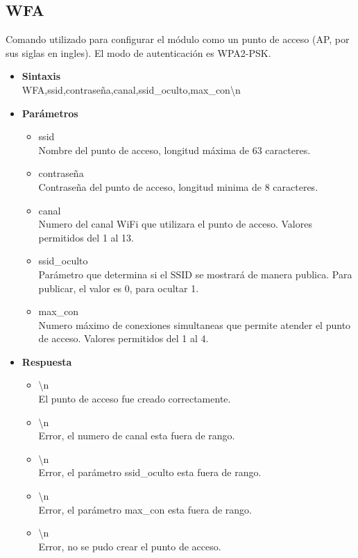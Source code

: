 \documentclass[a4paper,spanish]{article}
\begin{document}
\subsection{WFA}
Comando utilizado para configurar el módulo como un punto de acceso (AP, por sus siglas en ingles). El modo de autenticación es WPA2-PSK.
\begin{itemize}
	\item \textbf{Sintaxis}\\
	{\ttfamily WFA,ssid,contraseña,canal,ssid\_oculto,max\_con\textbackslash n}
	\item \textbf{Parámetros}
	\begin{itemize}
		\item{\ttfamily ssid}\\
		Nombre del punto de acceso, longitud máxima de 63 caracteres.
		\item{\ttfamily contraseña}\\
		Contraseña del punto de acceso, longitud minima de 8 caracteres. 
		\item{\ttfamily canal}\\
		Numero del canal WiFi que utilizara el punto de acceso. Valores permitidos del 1 al 13.
		\item{\ttfamily ssid\_oculto}\\
		Parámetro que determina si el SSID se mostrará de manera publica. Para publicar, el valor es 0, para ocultar 1. 
		\item{\ttfamily max\_con}\\
		Numero máximo de conexiones simultaneas que permite atender el punto de acceso. Valores permitidos del 1 al 4. 
	\end{itemize}
	\item \textbf{Respuesta}
	\begin{itemize}
		\item{\textbackslash n} \\
		El punto de acceso fue creado correctamente.
		\item{\textbackslash n} \\
		Error, el numero de canal esta fuera de rango.
		\item{\textbackslash n} \\
		Error, el parámetro {\ttfamily ssid\_oculto} esta fuera de rango.
		\item{\textbackslash n} \\
		Error, el parámetro {\ttfamily max\_con} esta fuera de rango.
		\item{\textbackslash n} \\
		Error, no se pudo crear el punto de acceso. 
	\end{itemize}
\end{itemize}
\end{document}
